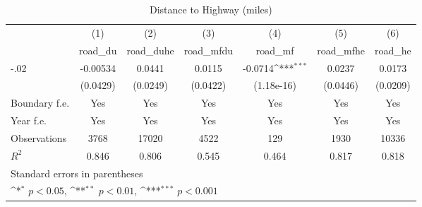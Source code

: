 \begin{table}[htbp]\centering
\def\sym#1{\ifmmode^{#1}\else\(^{#1}\)\fi}
\caption{Distance to Highway (miles)}
\begin{tabular}{l*{6}{c}}
\hline\hline
                    &\multicolumn{1}{c}{(1)}&\multicolumn{1}{c}{(2)}&\multicolumn{1}{c}{(3)}&\multicolumn{1}{c}{(4)}&\multicolumn{1}{c}{(5)}&\multicolumn{1}{c}{(6)}\\
                    &\multicolumn{1}{c}{road\_du}&\multicolumn{1}{c}{road\_duhe}&\multicolumn{1}{c}{road\_mfdu}&\multicolumn{1}{c}{road\_mf}&\multicolumn{1}{c}{road\_mfhe}&\multicolumn{1}{c}{road\_he}\\
\hline
-.02                &    -0.00534         &      0.0441         &      0.0115         &     -0.0714\sym{***}&      0.0237         &      0.0173         \\
                    &    (0.0429)         &    (0.0249)         &    (0.0422)         &  (1.18e-16)         &    (0.0446)         &    (0.0209)         \\
[1em]
Boundary f.e.       &         Yes         &         Yes         &         Yes         &         Yes         &         Yes         &         Yes         \\
[1em]
Year f.e.           &         Yes         &         Yes         &         Yes         &         Yes         &         Yes         &         Yes         \\
\hline
Observations        &        3768         &       17020         &        4522         &         129         &        1930         &       10336         \\
\(R^{2}\)           &       0.846         &       0.806         &       0.545         &       0.464         &       0.817         &       0.818         \\
\hline\hline
\multicolumn{7}{l}{\footnotesize Standard errors in parentheses}\\
\multicolumn{7}{l}{\footnotesize \sym{*} \(p<0.05\), \sym{**} \(p<0.01\), \sym{***} \(p<0.001\)}\\
\end{tabular}
\end{table}
